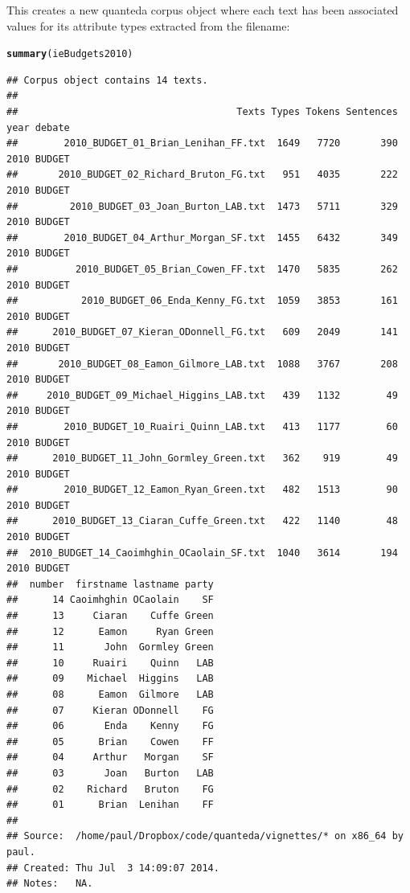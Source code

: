 \documentclass[11pt]{article}\usepackage[]{graphicx}\usepackage[]{color}
\makeatletter
\newcommand{\hlstd}[1]{\textcolor[rgb]{0.345,0.345,0.345}{#1}}%
\newcommand{\hlkwd}[1]{\textcolor[rgb]{0.737,0.353,0.396}{\textbf{#1}}}%
\newenvironment{kframe}{%
 \def\at@end@of@kframe{}%
 \ifinner\ifhmode%
  \def\at@end@of@kframe{\end{minipage}}%
  \begin{minipage}{\columnwidth}%
 \fi\fi%
 \def\FrameCommand##1{\hskip\@totalleftmargin \hskip-\fboxsep
 \colorbox{shadecolor}{##1}\hskip-\fboxsep
     \hskip-\linewidth \hskip-\@totalleftmargin \hskip\columnwidth}%
 \MakeFramed {\advance\hsize-\width
   \@totalleftmargin\z@ \linewidth\hsize
   \@setminipage}}%
 {\par\unskip\endMakeFramed%
 \at@end@of@kframe}
\newenvironment{knitrout}{}{} %
\makeatother
\begin{document}
This creates a new quanteda corpus object where each text has been associated values for its attribute types extracted from the filename:

\begin{knitrout}\footnotesize
{}\color{fgcolor}\begin{kframe}
\begin{alltt}
\hlkwd{summary}\hlstd{(ieBudgets2010)}
\end{alltt}
\begin{verbatim}
## Corpus object contains 14 texts.
## 
##                                      Texts Types Tokens Sentences year debate
##        2010_BUDGET_01_Brian_Lenihan_FF.txt  1649   7720       390 2010 BUDGET
##       2010_BUDGET_02_Richard_Bruton_FG.txt   951   4035       222 2010 BUDGET
##         2010_BUDGET_03_Joan_Burton_LAB.txt  1473   5711       329 2010 BUDGET
##        2010_BUDGET_04_Arthur_Morgan_SF.txt  1455   6432       349 2010 BUDGET
##          2010_BUDGET_05_Brian_Cowen_FF.txt  1470   5835       262 2010 BUDGET
##           2010_BUDGET_06_Enda_Kenny_FG.txt  1059   3853       161 2010 BUDGET
##      2010_BUDGET_07_Kieran_ODonnell_FG.txt   609   2049       141 2010 BUDGET
##       2010_BUDGET_08_Eamon_Gilmore_LAB.txt  1088   3767       208 2010 BUDGET
##     2010_BUDGET_09_Michael_Higgins_LAB.txt   439   1132        49 2010 BUDGET
##        2010_BUDGET_10_Ruairi_Quinn_LAB.txt   413   1177        60 2010 BUDGET
##      2010_BUDGET_11_John_Gormley_Green.txt   362    919        49 2010 BUDGET
##        2010_BUDGET_12_Eamon_Ryan_Green.txt   482   1513        90 2010 BUDGET
##      2010_BUDGET_13_Ciaran_Cuffe_Green.txt   422   1140        48 2010 BUDGET
##  2010_BUDGET_14_Caoimhghin_OCaolain_SF.txt  1040   3614       194 2010 BUDGET
##  number  firstname lastname party
##      14 Caoimhghin OCaolain    SF
##      13     Ciaran    Cuffe Green
##      12      Eamon     Ryan Green
##      11       John  Gormley Green
##      10     Ruairi    Quinn   LAB
##      09    Michael  Higgins   LAB
##      08      Eamon  Gilmore   LAB
##      07     Kieran ODonnell    FG
##      06       Enda    Kenny    FG
##      05      Brian    Cowen    FF
##      04     Arthur   Morgan    SF
##      03       Joan   Burton   LAB
##      02    Richard   Bruton    FG
##      01      Brian  Lenihan    FF
## 
## Source:  /home/paul/Dropbox/code/quanteda/vignettes/* on x86_64 by paul.
## Created: Thu Jul  3 14:09:07 2014.
## Notes:   NA.
\end{verbatim}
\end{kframe}
\end{knitrout}
\end{document}
